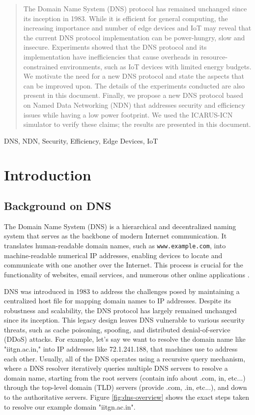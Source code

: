 \documentclass[conference]{IEEEtran}
\begin{document}
\begin{abstract}
The Domain Name System (DNS) protocol has remained unchanged since its inception in 1983. While it is efficient for general computing, the increasing importance and number of edge devices and IoT may reveal that the current DNS protocol implementation can be power-hungry, slow and insecure. Experiments showed that the DNS protocol and its implementation have inefficiencies that cause overheads in resource-constrained environments, such as IoT devices with limited energy budgets. We motivate the need for a new DNS protocol and state the aspects that can be improved upon. The details of the experiments conducted are also present in this document. Finally, we propose a new DNS protocol based on Named Data Networking (NDN) that addresses security and efficiency issues while having a low power footprint. We used the ICARUS-ICN simulator to verify these claims; the results are presented in this document.
\end{abstract}

\begin{IEEEkeywords}
DNS, NDN, Security, Efficiency, Edge Devices, IoT
\end{IEEEkeywords}

\section{Introduction}
\subsection{Background on DNS}
The Domain Name System (DNS) is a hierarchical and decentralized naming system that serves as the backbone of modern Internet communication. It translates human-readable domain names, such as \texttt{www.example.com}, into machine-readable numerical IP addresses, enabling devices to locate and communicate with one another over the Internet. This process is crucial for the functionality of websites, email services, and numerous other online applications \cite{mockapetris1983dns}.

DNS was introduced in 1983 to address the challenges posed by maintaining a centralized host file for mapping domain names to IP addresses. Despite its robustness and scalability, the DNS protocol has largely remained unchanged since its inception. This legacy design leaves DNS vulnerable to various security threats, such as cache poisoning, spoofing, and distributed denial-of-service (DDoS) attacks. For example, let's say we want to resolve the domain name like "iitgn.ac.in," into IP addresses like 72.1.241.188, that machines use to address each other. Usually, all of the DNS operates using a recursive query mechanism, where a DNS resolver iteratively queries multiple DNS servers to resolve a domain name, starting from the root servers (contain info about .com, in, etc...) through the top-level domain (TLD) servers (provide .com, .in,  etc...), and down to the authoritative servers. Figure \ref{fig:dns-overview} shows the exact steps taken to resolve our example domain "iitgn.ac.in". 
\end{document}
